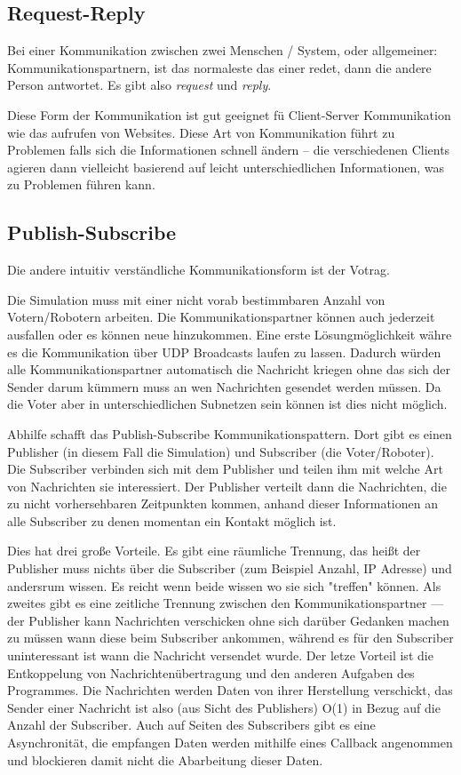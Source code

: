 \subsection{Request-Reply}
Bei einer Kommunikation zwischen zwei Menschen / System, oder allgemeiner: Kommunikationspartnern,
ist das normaleste das einer redet, dann die andere Person antwortet. Es gibt also \textit{request}
und \textit{reply}.

Diese Form der Kommunikation ist gut geeignet f{\"{u}} Client-Server Kommunikation wie das
aufrufen von Websites. Diese Art von Kommunikation f{\"{u}}hrt zu Problemen falls sich die
Informationen schnell {\"{a}}ndern -- die verschiedenen Clients agieren dann vielleicht basierend
auf leicht unterschiedlichen Informationen, was zu Problemen f{\"{u}}hren kann.

\subsection{Publish-Subscribe}
Die andere intuitiv verst{\"{a}}ndliche Kommunikationsform ist der Votrag.

Die Simulation muss mit einer nicht vorab bestimmbaren Anzahl von Votern/Robotern arbeiten. Die Kommunikationspartner k{\"{o}}nnen auch jederzeit ausfallen oder es k{\"{o}}nnen neue hinzukommen.
Eine erste L{\"{o}}sungm{\"{o}}glichkeit w{\"{a}}hre es die Kommunikation {\"{u}}ber UDP Broadcasts
laufen zu lassen. Dadurch w{\"{u}}rden alle Kommunikationspartner automatisch die Nachricht kriegen ohne
das sich der Sender darum k{\"{u}}mmern muss an wen Nachrichten gesendet werden m{\"{u}}ssen. Da die
Voter aber in unterschiedlichen Subnetzen sein k{\"{o}}nnen ist dies nicht m{\"{o}}glich.

Abhilfe schafft das Publish-Subscribe Kommunikationspattern\cite{pubsub}. Dort gibt es einen Publisher (in
diesem Fall die Simulation) und Subscriber (die Voter/Roboter). Die Subscriber verbinden sich mit dem
Publisher und teilen ihm mit welche Art von Nachrichten sie interessiert. Der Publisher verteilt dann die
Nachrichten, die zu nicht vorhersehbaren Zeitpunkten kommen, anhand dieser Informationen an alle Subscriber zu denen momentan ein Kontakt m{\"{o}}glich ist.

Dies hat drei gro{\ss}e Vorteile. Es gibt eine r{\"{a}}umliche Trennung, das hei{\ss}t der Publisher muss
nichts {\"{u}}ber die Subscriber (zum Beispiel Anzahl, IP Adresse) und andersrum wissen. Es reicht
wenn beide wissen wo sie sich "treffen" k{\"{o}}nnen. Als zweites gibt es eine zeitliche Trennung zwischen
den Kommunikationspartner --- der Publisher kann Nachrichten verschicken ohne sich dar{\"{u}}ber Gedanken
machen zu m{\"{u}}ssen wann diese beim Subscriber ankommen, w{\"{a}}hrend es f{\"{u}}r den Subscriber
uninteressant ist wann die Nachricht versendet wurde. Der letze Vorteil ist die Entkoppelung von
Nachrichten{\"{u}}bertragung und den anderen Aufgaben des Programmes. Die Nachrichten werden Daten
von ihrer Herstellung verschickt, das Sender einer Nachricht ist also (aus Sicht des
Publishers) O(1) in Bezug auf die Anzahl der Subscriber. Auch auf Seiten des Subscribers gibt es eine
Asynchronit{\"{a}}t, die empfangen Daten werden mithilfe eines Callback angenommen und blockieren damit
nicht die Abarbeitung dieser Daten.

